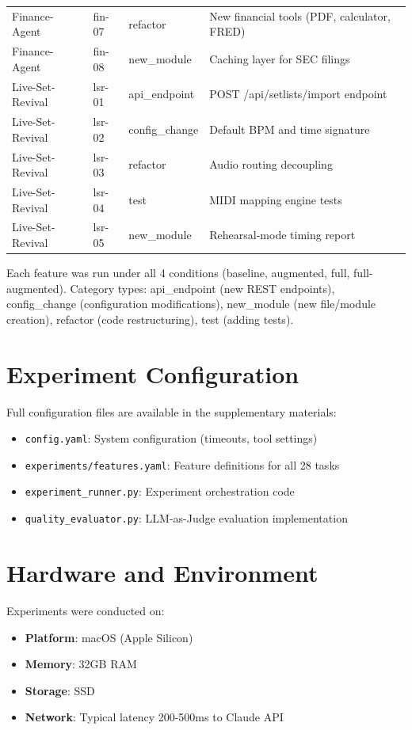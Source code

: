 \documentclass[sigconf,anonymous,review]{acmart}
\begin{document}
\begin{table}[ht]
\begin{tabular}{lllp{4.5cm}}
    Finance-Agent & fin-07 & refactor & New financial tools (PDF, calculator, FRED) \\
    Finance-Agent & fin-08 & new\_module & Caching layer for SEC filings \\
    Live-Set-Revival & lsr-01 & api\_endpoint & POST /api/setlists/import endpoint \\
    Live-Set-Revival & lsr-02 & config\_change & Default BPM and time signature \\
    Live-Set-Revival & lsr-03 & refactor & Audio routing decoupling \\
    Live-Set-Revival & lsr-04 & test & MIDI mapping engine tests \\
    Live-Set-Revival & lsr-05 & new\_module & Rehearsal-mode timing report \\
    \hline
  \end{tabular}
\end{table}

Each feature was run under all 4 conditions (baseline, augmented, full, full-augmented). Category types: api\_endpoint (new REST endpoints), config\_change (configuration modifications), new\_module (new file/module creation), refactor (code restructuring), test (adding tests).

\section{Experiment Configuration}

Full configuration files are available in the supplementary materials:
\begin{itemize}
  \item \texttt{config.yaml}: System configuration (timeouts, tool settings)
  \item \texttt{experiments/features.yaml}: Feature definitions for all 28 tasks
  \item \texttt{experiment\_runner.py}: Experiment orchestration code
  \item \texttt{quality\_evaluator.py}: LLM-as-Judge evaluation implementation
\end{itemize}

\section{Hardware and Environment}

Experiments were conducted on:
\begin{itemize}
  \item \textbf{Platform}: macOS (Apple Silicon)
  \item \textbf{Memory}: 32GB RAM
  \item \textbf{Storage}: SSD
  \item \textbf{Network}: Typical latency 200-500ms to Claude API
\end{itemize}
\end{document}
